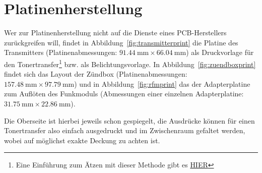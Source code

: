 \documentclass[paper=a4, parskip, numbers=noenddot, toc=listof, headsepline]{scrbook}
\begin{document}
			\normalsize

		\chapter{Platinenherstellung}
			\label{ch:platinenherstellung}

			Wer zur Platinenherstellung nicht auf die Dienste eines PCB-Herstellers zurückgreifen will, findet in Abbildung~\ref{fig:transmitterprint} die Platine des Transmitters (Platinenabmessungen: $\SI{91,44}{\milli\metre}\times\SI{66,04}{\milli\metre}$) als Druckvorlage für den Tonertransfer\footnote{Eine Einführung zum Ätzen mit dieser Methode gibt es \href{http://thomaspfeifer.net/platinen_aetzen.htm}{HIER}} bzw. als Belichtungsvorlage. In Abbildung~\ref{fig:zuendboxprint} findet sich das Layout der Zündbox (Platinenabmessungen: $\SI{157,48}{\milli\metre}\times\SI{97,79}{\milli\metre}$) und in Abbildung~\ref{fig:rfmprint} das der Adapterplatine zum Auflöten des Funkmoduls (Abmessungen einer einzelnen Adapterplatine: $\SI{31,75}{\milli\metre}\times\SI{22,86}{\milli\metre}$).

			Die Oberseite ist hierbei jeweils schon gespiegelt, die Ausdrücke können für einen Tonertransfer also einfach ausgedruckt und im Zwischenraum gefaltet werden, wobei auf möglichst exakte Deckung zu achten ist.
\end{document}
